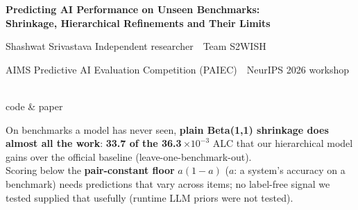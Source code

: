 \documentclass{article}
\newcommand{\bodysize}{22}\newcommand{\bodyskip}{27}
\begin{document}
\fontsize{\bodysize}{\bodyskip}\selectfont
\color{ink}

\begin{tcolorbox}[enhanced, colback=ink, colframe=ink, arc=0pt, left=24pt, right=24pt, top=22pt, bottom=22pt,
  after skip=30pt]
\color{white}
\begin{minipage}[c]{0.82\linewidth}
{\raggedright\fontsize{50}{58}\selectfont\bfseries Predicting AI Performance on Unseen Benchmarks:\\[4pt]
Shrinkage, Hierarchical Refinements and Their Limits\par}
\vspace{18pt}
{\fontsize{32}{38}\selectfont Shashwat Srivastava \quad\textcolor{white!70}{Independent researcher \,\textperiodcentered\, Team S2WISH}\par}
\vspace{6pt}
{\fontsize{25}{30}\selectfont\textcolor{white!70}{AIMS Predictive AI Evaluation Competition (PAIEC) \,\textperiodcentered\, NeurIPS 2026 workshop}\par}
\end{minipage}\hfill
\begin{minipage}[c]{0.15\linewidth}\centering
\colorbox{white}{\color{black}}\\[6pt]
{\fontsize{20}{24}\selectfont\textcolor{white!80}{code \& paper}}
\end{minipage}
\end{tcolorbox}

\begin{tcolorbox}[key]
\centering\fontsize{28}{34}\selectfont
On benchmarks a model has never seen, \textbf{plain Beta(1,1) shrinkage does almost all the work}:
\textbf{33.7 of the 36.3}\,$\times10^{-3}$ ALC that our hierarchical model gains over the official baseline
(leave-one-benchmark-out).\\[14pt]
Scoring below the \textbf{pair-constant floor} $a(1-a)$ ($a$: a system's accuracy on a benchmark) needs predictions
that vary across items; no label-free signal we tested supplied that usefully (runtime LLM priors were not tested).
\end{tcolorbox}
\end{document}
